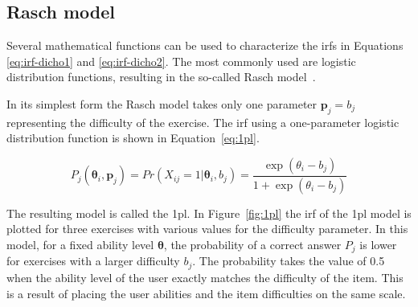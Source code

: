 \subsection{Rasch model}
\label{sec:rasch}
Several mathematical functions can be used to characterize the \glspl{irf} in Equations \ref{eq:irf-dicho1} and \ref{eq:irf-dicho2}.
The most commonly used are logistic distribution functions, resulting in the so-called Rasch model~\cite{rasch1960probabilistic}.



In its simplest form the Rasch model takes only one parameter $\bm{p}_j = b_j$ representing the difficulty of the exercise. 
The \gls{irf} using a one-parameter logistic distribution function is shown in Equation~\ref{eq:1pl}.

\begin{equation}
    \label{eq:1pl}
    P_{j}(\bm{\theta}_i,\bm{p}_j) =
    Pr(X_{ij} = 1 | \bm{\theta}_i,b_j) =
    \frac{\exp(\theta_i - b_j)}{1 + \exp(\theta_i - b_j)}
\end{equation}

The resulting model is called the \gls{1pl}. 
In Figure~\ref{fig:1pl} the \gls{irf} of the \gls{1pl} model is plotted for three exercises with various values for the difficulty parameter.
In this model, for a fixed ability level $\bm\theta$, the probability of a correct answer $P_j$ is lower for exercises with a larger difficulty $b_j$.
The probability takes the value of 0.5 when the ability level of the user exactly matches the difficulty of the item.
This is a result of placing the user abilities and the item difficulties on the same scale.

